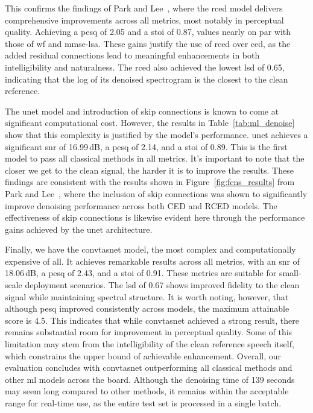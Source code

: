 This confirms the findings of Park and Lee~\cite{park2017acoustic}, where the \gls{rced} model delivers comprehensive improvements across all metrics, most notably in perceptual quality. Achieving a \gls{pesq} of 2.05 and a \gls{stoi} of 0.87, values nearly on par with those of \gls{wf} and \gls{mmse-lsa}. These gains justify the use of \gls{rced} over \gls{ced}, as the added residual connections lead to meaningful enhancements in both intelligibility and naturalness. The \gls{rced} also achieved the lowest \gls{lsd} of 0.65, indicating that the log of its denoised spectrogram is the closest to the clean reference.

The \gls{unet} model and introduction of skip connections is known to come at significant computational cost. However, the results in Table~\ref{tab:ml_denoise} show that this complexity is justified by the model's performance. \gls{unet} achieves a significant \gls{snr} of 16.99 dB, a \gls{pesq} of 2.14, and a \gls{stoi} of 0.89. This is the first model to pass all classical methods in all metrics. It’s important to note that the closer we get to the clean signal, the harder it is to improve the results. These findings are consistent with the results shown in Figure~\ref{fig:fcns_results} from Park and Lee~\cite{park2017acoustic}, where the inclusion of skip connections was shown to significantly improve denoising performance across both CED and RCED models. The effectiveness of skip connections is likewise evident here through the performance gains achieved by the \gls{unet} architecture.

Finally, we have the \gls{convtasnet} model, the most complex and computationally expensive of all. It achieves remarkable results across all metrics, with an \gls{snr} of 18.06 dB, a \gls{pesq} of 2.43, and a \gls{stoi} of 0.91. These metrics are suitable for small-scale deployment scenarios. The \gls{lsd} of 0.67 shows improved fidelity to the clean signal while maintaining spectral structure. It is worth noting, however, that although \gls{pesq} improved consistently across models, the maximum attainable score is 4.5. This indicates that while \gls{convtasnet} achieved a strong result, there remains substantial room for improvement in perceptual quality. Some of this limitation may stem from the intelligibility of the clean reference speech itself, which constrains the upper bound of achievable enhancement. Overall, our evaluation concludes with \gls{convtasnet} outperforming all classical methods and other \gls{ml} models across the board. Although the denoising time of 139 seconds may seem long compared to other methods, it remains within the acceptable range for real-time use, as the entire test set is processed in a single batch.